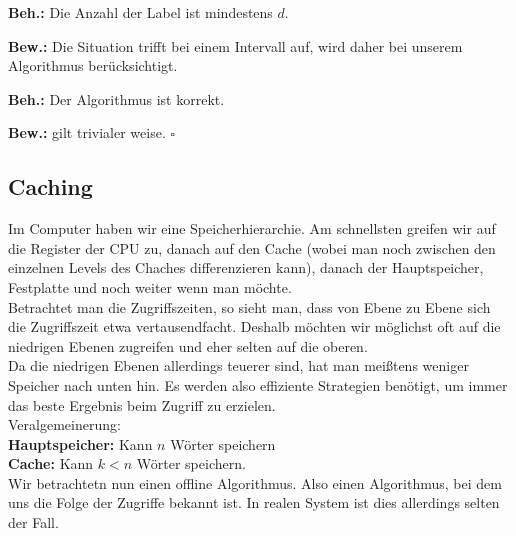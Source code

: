 \begin{description}
\begin{description}

\item{\bfseries Beh.:} Die Anzahl der Label ist mindestens $d$.

\item{\bfseries Bew.:} Die Situation trifft bei einem Intervall auf, wird daher bei unserem Algorithmus berücksichtigt.

\item{\bfseries Beh.:} Der Algorithmus ist korrekt.

\item{\bfseries Bew.:} gilt trivialer weise. \mbox{} \hfill $\square$

\end{description}

\end{description}

\subsection{Caching}

Im Computer haben wir eine Speicherhierarchie. Am schnellsten greifen wir auf die Register der CPU zu, danach auf den Cache (wobei man noch zwischen den einzelnen Levels des Chaches differenzieren kann), danach der Hauptspeicher, Festplatte und noch weiter wenn man möchte.\\

Betrachtet man die Zugriffszeiten, so sieht man, dass von Ebene zu Ebene sich die Zugriffszeit etwa vertausendfacht. Deshalb möchten wir möglichst oft auf die niedrigen Ebenen zugreifen und eher selten auf die oberen.\\

Da die niedrigen Ebenen allerdings teuerer sind, hat man meißtens weniger Speicher nach unten hin. Es werden also effiziente Strategien benötigt, um immer das beste Ergebnis beim Zugriff zu erzielen.\\

Veralgemeinerung:\\
\textbf{Hauptspeicher:} Kann $n$ Wörter speichern\\
\textbf{Cache:} Kann $k < n$ Wörter speichern.\\

Wir betrachtetn nun einen offline Algorithmus. Also einen Algorithmus, bei dem uns die Folge der Zugriffe bekannt ist. In realen System ist dies allerdings selten der Fall.

